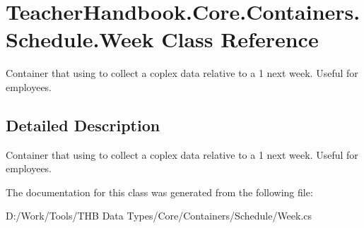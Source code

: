 \hypertarget{class_teacher_handbook_1_1_core_1_1_containers_1_1_schedule_1_1_week}{}\section{Teacher\+Handbook.\+Core.\+Containers.\+Schedule.\+Week Class Reference}
\label{class_teacher_handbook_1_1_core_1_1_containers_1_1_schedule_1_1_week}


Container that using to collect a coplex data relative to a 1 next week. Useful for employees.  




\subsection{Detailed Description}
Container that using to collect a coplex data relative to a 1 next week. Useful for employees. 



The documentation for this class was generated from the following file\+:\begin{DoxyCompactItemize}
\item 
D\+:/\+Work/\+Tools/\+T\+H\+B Data Types/\+Core/\+Containers/\+Schedule/Week.\+cs\end{DoxyCompactItemize}
